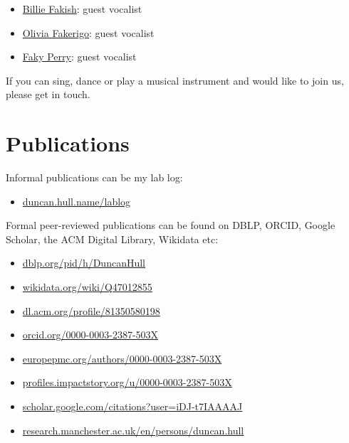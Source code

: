 \documentclass[
  12pt,
]{book}
\providecommand{\tightlist}{%
  \setlength{\itemsep}{0pt}\setlength{\parskip}{0pt}}
\begin{document}
\begin{itemize}
\tightlist
\item
  \href{https://en.wikipedia.org/wiki/Billie_Eilish}{Billie Fakish}: guest vocalist \citep{badguy}
\item
  \href{https://en.wikipedia.org/wiki/Olivia_Rodrigo}{Olivia Fakerigo}: guest vocalist \citep{good4u}
\item
  \href{https://en.wikipedia.org/wiki/Katy_Perry}{Faky Perry}: guest vocalist \citep{roar}
\end{itemize}

If you can sing, dance or play a musical instrument and would like to join us, please get in touch.

\hypertarget{publications}{%
\section{Publications}\label{publications}}

Informal publications can be my lab log:

\begin{itemize}
\tightlist
\item
  \href{https://duncan.hull.name/lablog/}{duncan.hull.name/lablog}
\end{itemize}

Formal peer-reviewed publications can be found on DBLP, ORCID, Google Scholar, the ACM Digital Library, Wikidata etc:

\begin{itemize}
\tightlist
\item
  \href{https://dblp.org/pid/h/DuncanHull}{dblp.org/pid/h/DuncanHull}
\item
  \href{https://www.wikidata.org/wiki/Q47012855}{wikidata.org/wiki/Q47012855}
\item
  \href{https://dl.acm.org/profile/81350580198}{dl.acm.org/profile/81350580198}
\item
  \href{https://orcid.org/0000-0003-2387-503X}{orcid.org/0000-0003-2387-503X}
\item
  \href{https://europepmc.org/authors/0000-0003-2387-503X}{europepmc.org/authors/0000-0003-2387-503X}
\item
  \href{https://profiles.impactstory.org/u/0000-0003-2387-503X}{profiles.impactstory.org/u/0000-0003-2387-503X}
\item
  \href{https://scholar.google.com/citations?user=iDJ-t7IAAAAJ}{scholar.google.com/citations?user=iDJ-t7IAAAAJ}
\item
  \href{https://research.manchester.ac.uk/en/persons/duncan.hull}{research.manchester.ac.uk/en/persons/duncan.hull}
\end{itemize}
\end{document}
